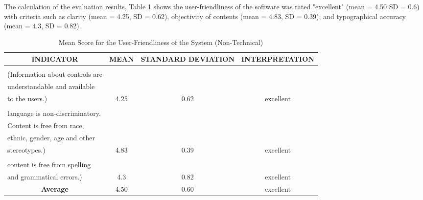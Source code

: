 \parx
The calculation of the evaluation results, Table
\ref{table:non_tech_use_friendliness} shows the user-friendliness of the software
was rated "excellent" (mean = 4.50 SD = 0.6) with criteria such as clarity (mean
= 4.25, SD = 0.62), objectivity of contents (mean = 4.83, SD = 0.39), and
typographical accuracy (mean = 4.3, SD = 0.82).

\begin{longtable}[c]{l c c c}
\caption{Mean Score for the User-Friendliness of the System (Non-Technical)}
\label{table:non_tech_use_friendliness} \\
\hline
\multicolumn{1}{c}{\textbf{INDICATOR}}                                                                                                                                               & \textbf{MEAN} & \textbf{STANDARD DEVIATION} & \textbf{INTERPRETATION} \\ \hline
\endfirsthead
%
\endhead
%
\begin{tabular}[c]{@{}l@{}}1. Clarity of controls\\ (Information about controls are\\ understandable and available\\ to the users.)\end{tabular}                                       & 4.25           & 0.62                         & excellent                     \\
\begin{tabular}[c]{@{}l@{}}2. Objectivity of contents (The\\ language is non-discriminatory.\\ Content is free from race,\\ ethnic, gender, age and other\\ stereotypes.)\end{tabular} & 4.83           & 0.39                         & excellent                     \\
\begin{tabular}[c]{@{}l@{}}3. Typographical Accuracy (The\\ content is free from spelling\\ and grammatical errors.)\end{tabular}                                                      & 4.3           & 0.82                         & excellent                     \\
\multicolumn{1}{c}{\textbf{Average}}                                                                                                                                                 & 4.50           & 0.60                         & excellent                     \\ \hline
\end{longtable}

